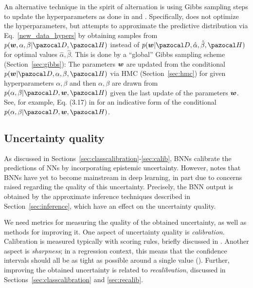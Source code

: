 An alternative technique in the spirit of alternation is using Gibbs sampling steps to update the hyperparameters as done in \textcite{neal1995bayesian} and \textcite{nalisnick2018priors}.
Specifically, \textcite{neal1995bayesian} does not optimize the hyperparameters, but attempts to approximate the predictive distribution via Eq.~\eqref{new_data_hypers} by obtaining samples from $p(\bw,\alpha,\beta|\cD,\cH)$ instead of $p(\bw|\cD,\hat{\alpha},\hat{\beta},\cH)$ for optimal values $\hat{\alpha},\hat{\beta}$. 
This is done by a ``global'' Gibbs sampling scheme (Section~\ref{sec:gibbs}): The parameters $\boldsymbol{w}$ are updated from the conditional $p(\bw|\cD,\alpha,\beta,\cH)$ via HMC (Section~\ref{sec:hmc}) for given hyperparameters $\alpha,\beta$ and then $\alpha,\beta$ are drawn from $p(\alpha,\beta|\cD,\bw,\cH)$ given the last update of the parameters $\boldsymbol{w}$. 
See, for example, Eq. (3.17) in \textcite{neal1995bayesian} for an indicative form of the conditional $p(\alpha,\beta|\cD,\bw,\cH)$. 

\subsection{Uncertainty quality}\label{sec:quality}
As discussed in Sections~\ref{sec:classcalibration}-\ref{sec:calib}, BNNs calibrate the predictions of NNs by incorporating epistemic uncertainty.
However, \textcite{foong2019expressiveness} notes that BNNs have yet to become mainstream in deep learning, in part due to concerns raised regarding the quality of this uncertainty.
Precisely, the BNN output is obtained by the approximate inference techniques described in Section~\ref{sec:inference}, which have an effect on the uncertainty quality.

We need metrics for measuring the quality of the obtained uncertainty, as well as methods for improving it. 
One aspect of uncertainty quality is \textit{calibration}.
Calibration is measured typically with scoring rules, briefly discussed in \textcite{lakshminarayanan2017simple}.
Another aspect is \textit{sharpness}; in a regression context, this means that the confidence intervals should all be as tight as possible around a single value (\cite{kuleshov2018accurate}).
Further, improving the obtained uncertainty is related to \textit{recalibration}, discussed in Sections~\ref{sec:classcalibration} and \ref{sec:recalib}.


